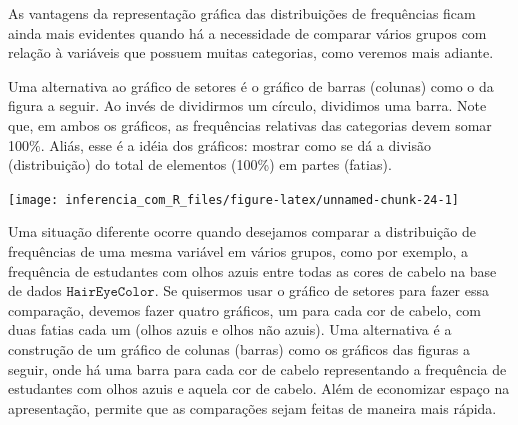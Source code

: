\documentclass[
]{book}
\newenvironment{Shaded}{\begin{snugshade}}{\end{snugshade}}
\newcommand{\AttributeTok}[1]{\textcolor[rgb]{0.77,0.63,0.00}{#1}}
\newcommand{\FloatTok}[1]{\textcolor[rgb]{0.00,0.00,0.81}{#1}}
\newcommand{\FunctionTok}[1]{\textcolor[rgb]{0.00,0.00,0.00}{#1}}
\newcommand{\NormalTok}[1]{#1}
\newcommand{\OtherTok}[1]{\textcolor[rgb]{0.56,0.35,0.01}{#1}}
\newcommand{\SpecialCharTok}[1]{\textcolor[rgb]{0.00,0.00,0.00}{#1}}
\newcommand{\StringTok}[1]{\textcolor[rgb]{0.31,0.60,0.02}{#1}}
\begin{document}
As vantagens da representação gráfica das distribuições de frequências ficam ainda mais evidentes quando há a necessidade de comparar vários grupos com relação à variáveis que possuem muitas categorias, como veremos mais adiante.

Uma alternativa ao gráfico de setores é o gráfico de barras (colunas) como o da figura a seguir. Ao invés de dividirmos um círculo, dividimos uma barra. Note que, em ambos os gráficos, as frequências relativas das categorias devem somar 100\%. Aliás, esse é a idéia dos gráficos: mostrar como se dá a divisão (distribuição) do total de elementos (100\%) em partes (fatias).

\begin{Shaded}
\end{Shaded}

\begin{center}\texttt{[image: inferencia\_com\_R\_files/figure-latex/unnamed-chunk-24-1]} \end{center}

Uma situação diferente ocorre quando desejamos comparar a distribuição de frequências de uma mesma variável em vários grupos, como por exemplo, a frequência de estudantes com olhos azuis entre todas as cores de cabelo na base de dados \(\texttt{HairEyeColor}\). Se quisermos usar o gráfico de setores para fazer essa comparação, devemos fazer quatro gráficos, um para cada cor de cabelo, com duas fatias cada um (olhos azuis e olhos não azuis). Uma alternativa é a construção de um gráfico de colunas (barras) como os gráficos das figuras a seguir, onde há uma barra para cada cor de cabelo representando a frequência de estudantes com olhos azuis e aquela cor de cabelo. Além de economizar espaço na apresentação, permite que as comparações sejam feitas de maneira mais rápida.
\end{document}
